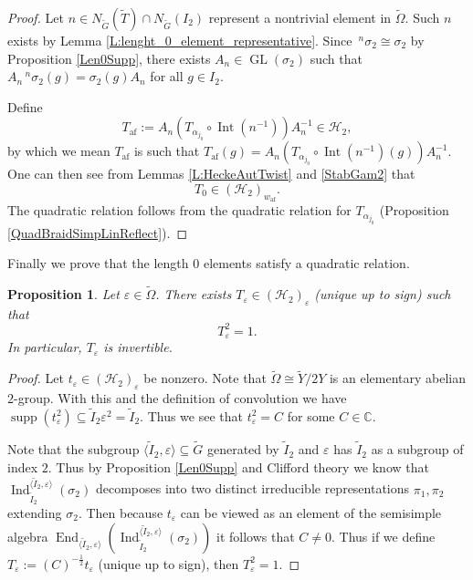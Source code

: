 \documentclass[10pt, letterpaper]{amsart}
\theoremstyle{plain}
\newtheorem{Prop}[equation]{Proposition}
\theoremstyle{definition}
\numberwithin{equation}{section}
\newcommand{\GL}{\operatorname{GL}}
\newcommand{\Gt}{\widetilde{G}}
\newcommand{\It}{\widetilde{I}}
\newcommand{\Tt}{\widetilde{T}}
\newcommand{\Omegat}{\widetilde{\Omega}}
\newcommand{\Ind}{\operatorname{Ind}}
\newcommand{\supp}{\operatorname{supp}}
\newcommand{\End}{\operatorname{End}}
\newcommand{\Int}{\operatorname{Int}}
\newcommand{\af}{\mathrm{af}}
\newcommand{\Hcal}{\mathcal{H}}
\begin{document}
\begin{proof}
Let $n\in N_{\Gt}(\Tt)\cap N_{\Gt}( I_2)$ represent a nontrivial element in $\Omegat$. Such $n$ exists by Lemma \ref{L:lenght_0_element_representative}. Since $\,^{n}\sigma_{2}\cong \sigma_{2}$ by Proposition \ref{Len0Supp}, there exists $A_{n}\in \GL(\sigma_2)$ such that $A_{n}\,^{n}\sigma_{2}(g)=\sigma_{2}(g)A_{n}$ for all $g\in  I_2$.

Define
\[
T_{\af}:=A_{n}(T_{\alpha_{j_{0}}}\circ\Int(n^{-1}))A_{n}^{-1}\in\Hcal_{2},
\]
by which we mean $T_{\af}$ is such that $T_{\af}(g)=A_{n}(T_{\alpha_{j_{0}}}\circ\Int(n^{-1})(g))A_{n}^{-1}$. One can then see from Lemmas \ref{L:HeckeAutTwist} and \ref{StabGam2} that
\[
T_0\in(\Hcal_2)_{w_{\af}}.
\]
The quadratic relation follows from the quadratic relation for $T_{\alpha_{j_{0}}}$ (Proposition \ref{QuadBraidSimpLinReflect}).
\end{proof}

Finally we prove that the length $0$ elements satisfy a quadratic relation.

\begin{Prop}\label{QuadLen0}
	Let $\varepsilon\in \Omegat$. There exists $T_{\varepsilon}\in (\Hcal_{2})_{\varepsilon}$ (unique up to sign) such that 
	\begin{equation*}
		T_{\varepsilon}^{2}=1.
	\end{equation*}
	In particular, $T_{\varepsilon}$ is invertible.
\end{Prop}

\begin{proof}
	Let $t_{\varepsilon}\in (\Hcal_{2})_{\varepsilon}$ be nonzero. Note that $\Omegat\cong \widetilde{Y}/2Y$ is an elementary abelian $2$-group. With this and the definition of convolution we have $\supp(t_{\varepsilon}^{2})\subseteq  \It_2 \varepsilon^{2}= \It_2$. Thus we see that $t_{\varepsilon}^{2}=C$ for some $C\in \mathbb{C}$.
	
	Note that the subgroup $\langle \It_2, \varepsilon\rangle\subseteq\Gt$ generated by $\It_2$ and $\varepsilon$ has $\It_2$ as a subgroup of index $2$. Thus by Proposition \ref{Len0Supp} and Clifford theory we know that $\Ind_{\It_2}^{\langle \It_2, \varepsilon\rangle}(\sigma_{2})$ decomposes into two distinct irreducible representations $\pi_{1},\pi_{2}$ extending $\sigma_{2}$. Then because $t_{\varepsilon}$ can be viewed as an element of the semisimple algebra $\End_{\langle \It_2, \varepsilon\rangle}(\Ind_{\It_2}^{\langle \It_2, \varepsilon\rangle}(\sigma_{2}))$ it follows that $C\neq 0$. Thus if we  define $T_{\varepsilon}:=(C)^{-\frac{1}{2}}t_{\varepsilon}$ (unique up to sign), then $T_{\varepsilon}^{2}=1$.
\end{proof}
\end{document}
